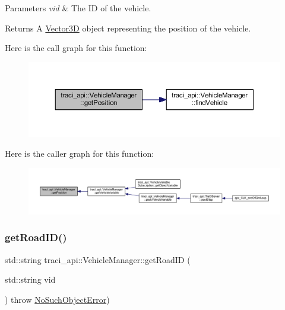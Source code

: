 \begin{DoxyParams}{Parameters}
{\em vid} & The ID of the vehicle. \\
\hline
\end{DoxyParams}
\begin{DoxyReturn}{Returns}
A \hyperlink{class_vector3_d}{Vector3D} object representing the position of the vehicle. 
\end{DoxyReturn}
Here is the call graph for this function\+:\nopagebreak
\begin{figure}[H]
\begin{center}
\leavevmode
\includegraphics[width=350pt]{classtraci__api_1_1_vehicle_manager_ad00a8d49736c7806f0d363d641b7f467_cgraph}
\end{center}
\end{figure}
Here is the caller graph for this function\+:\nopagebreak
\begin{figure}[H]
\begin{center}
\leavevmode
\includegraphics[width=350pt]{classtraci__api_1_1_vehicle_manager_ad00a8d49736c7806f0d363d641b7f467_icgraph}
\end{center}
\end{figure}
\mbox{\label{classtraci__api_1_1_vehicle_manager_a3cbdffab3f5fd337a6de08a14b87803e}} 
\subsubsection{\texorpdfstring{get\+Road\+I\+D()}{getRoadID()}}
{\footnotesize\ttfamily std\+::string traci\+\_\+api\+::\+Vehicle\+Manager\+::get\+Road\+ID (\begin{DoxyParamCaption}\item[{std\+::string}]{vid }\end{DoxyParamCaption}) throw  \hyperlink{classtraci__api_1_1_no_such_object_error}{No\+Such\+Object\+Error}) }

